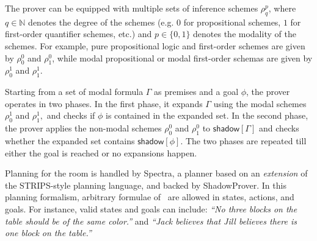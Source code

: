 The prover can be equipped
with multiple sets of inference schemes $\rho^p_{q}$, where
$q\in\mathbb{N}$ denotes the degree of the schemes (e.g. $0$ for
propositional schemes, $1$ for first-order quantifier schemes, etc.)
and $p\in\{0,1\}$ denotes the modality of the schemes. For example, pure
propositional logic and first-order schemes are given by $\rho^0_{0}$
and $\rho^0_{1}$, while modal
propositional or modal first-order schemas are given by $\rho^1_{0}$ and
$\rho^1_{1}$.


Starting from a set of modal formula $\Gamma$ as premises and a goal
$\phi$, the prover operates in two phases. In the first phase, it
expands $\Gamma$ using the modal schemes $\rho^1_{0}$ and
$\rho^1_{1}, $ and checks if $\phi$ is contained in the expanded
set. In the second phase, the prover applies the non-modal schemes
$\rho^0_{0} $ and $\rho^0_{1}$ to $\mathsf{shadow}[\Gamma]$ and checks whether
the expanded set contains $\mathsf{shadow}[\phi]$. The two phases are repeated
till either the goal is reached or no expansions happen.

Planning for the room is handled by \textsf{Spectra}, a planner based
on an \emph{extension} of the STRIPS-style
planning language, and backed by \textsf{ShadowProver}. In this planning formalism, arbitrary
formulae of \CEC\ are allowed in states, actions, and goals.  For
instance, valid states and goals can include: \emph{``No three blocks
on the table should be of the same color.''}  and \emph{``Jack
believes that Jill believes there is one block on the table.''}


